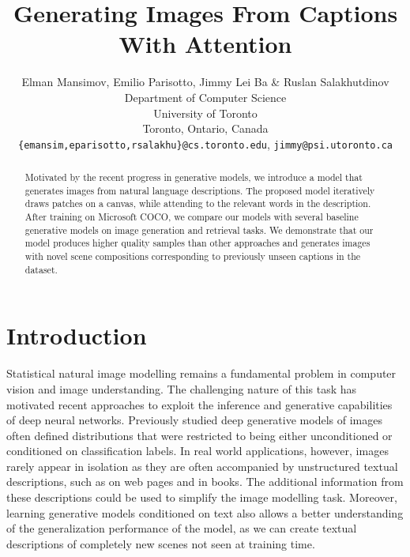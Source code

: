 \documentclass{article} %
\title{Generating Images From Captions\\ With Attention}
\author{
Elman Mansimov, Emilio Parisotto, Jimmy Lei Ba \& Ruslan Salakhutdinov\\
Department of Computer Science\\
University of Toronto\\
Toronto, Ontario, Canada\\
\texttt{\{emansim,eparisotto,rsalakhu\}@cs.toronto.edu}, \texttt{jimmy@psi.utoronto.ca}
}
\begin{document}
\maketitle

\begin{abstract}
Motivated by the recent progress in generative models, we introduce a model that generates images from natural language descriptions. The proposed model iteratively draws patches on a canvas, while attending to the relevant words in the description. After training on Microsoft COCO, we compare our models with several baseline generative models on image generation and retrieval tasks. We demonstrate that our model produces higher quality samples than other approaches and generates images with novel scene compositions corresponding to previously unseen captions in the dataset. 
\end{abstract}

\section{Introduction}
\vspace{-0.1in}
Statistical natural image modelling remains a fundamental problem in computer vision and image understanding. 
The challenging nature of this task has motivated recent approaches to exploit the inference and generative capabilities of deep neural networks.
Previously studied deep generative models of images often defined distributions that were restricted to being either unconditioned or conditioned on classification labels. In real world applications, however, images rarely appear in isolation as they are often accompanied by unstructured textual descriptions, such as on web pages and in books. 
The additional information from these descriptions could be used to simplify the image modelling task. Moreover, learning generative models conditioned on text also allows a better understanding of the generalization performance of the model, as we can create textual descriptions of completely new scenes not seen at training time. 
\end{document}

